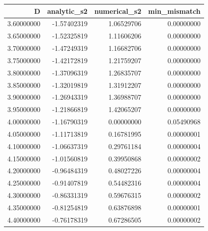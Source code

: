\begin{tabular}{rrrr}
\toprule
D & analytic_s2 & numerical_s2 & min_mismatch \\
\midrule
3.60000000 & -1.57402319 & 1.06529706 & 0.00000000 \\
3.65000000 & -1.52325819 & 1.11606206 & 0.00000000 \\
3.70000000 & -1.47249319 & 1.16682706 & 0.00000000 \\
3.75000000 & -1.42172819 & 1.21759207 & 0.00000000 \\
3.80000000 & -1.37096319 & 1.26835707 & 0.00000000 \\
3.85000000 & -1.32019819 & 1.31912207 & 0.00000000 \\
3.90000000 & -1.26943319 & 1.36988707 & 0.00000000 \\
3.95000000 & -1.21866819 & 1.42065207 & 0.00000000 \\
4.00000000 & -1.16790319 & 0.00000000 & 0.05490968 \\
4.05000000 & -1.11713819 & 0.16781995 & 0.00000001 \\
4.10000000 & -1.06637319 & 0.29761184 & 0.00000004 \\
4.15000000 & -1.01560819 & 0.39950868 & 0.00000002 \\
4.20000000 & -0.96484319 & 0.48027226 & 0.00000004 \\
4.25000000 & -0.91407819 & 0.54482316 & 0.00000004 \\
4.30000000 & -0.86331319 & 0.59676315 & 0.00000002 \\
4.35000000 & -0.81254819 & 0.63876898 & 0.00000001 \\
4.40000000 & -0.76178319 & 0.67286505 & 0.00000002 \\
\bottomrule
\end{tabular}
